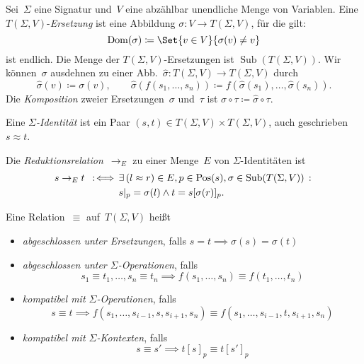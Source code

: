 \documentclass{cheat-sheet}
\DeclareMathOperator{\Pos}{Pos} %
\DeclareMathOperator{\Dom}{Dom} %
\DeclareMathOperator{\Subst}{Sub} %
\newcommand{\ident}{\approx} %
\begin{document}
\begin{defn}
  Sei~$\Sigma$ eine Signatur und~$V$ eine abzählbar unendliche Menge von Variablen.
  Eine $T(\Sigma, V)$-\emph{Ersetzung} ist eine Abbildung $\sigma : V \to T(\Sigma, V)$, für die gilt:
  \[
    \Dom(\sigma) \coloneqq \Set{v \in V}{\sigma(v) \neq v}
  \]
  ist endlich.
  Die Menge der $T(\Sigma, V)$-Ersetzungen ist $\Subst(T(\Sigma, V))$.
  Wir können~$\sigma$ ausdehnen zu einer Abb.~$\hat{\sigma} : T(\Sigma, V) \to T(\Sigma, V)$ durch
  \[
    \hat{\sigma}(v) \coloneqq \sigma(v), \qquad
    \hat{\sigma}(f(s_1, \ldots, s_n)) \coloneqq f(\hat{\sigma}(s_1), \ldots, \hat{\sigma}(s_n)).
  \]
  Die \textit{Komposition} zweier Ersetzungen~$\sigma$ und~$\tau$ ist $\sigma \circ \tau \coloneqq \hat{\sigma} \circ \tau$.
\end{defn}

\begin{defn}
  Eine \emph{$\Sigma$-Identität} ist ein Paar $(s, t) \in T(\Sigma, V) \times T(\Sigma, V)$, auch geschrieben $s \ident t$.
\end{defn}

\begin{defn}
  Die \emph{Reduktionsrelation}~$\to_E$ zu einer Menge~$E$ von $\Sigma$-Identitäten ist
  \begin{align*}
    s \to_E t \coloniff \, & \ex{(l \ident r) \in E, p \in \Pos(s), \sigma \in \Subst(T(\Sigma, V))} \\
    & s|_p = \sigma(l) \wedge t = s[\sigma(r)]_p.
  \end{align*}
\end{defn}

\begin{defn}
  Eine Relation~$\equiv$ auf~$T(\Sigma, V)$ heißt
  \begin{itemize}
    \item \emph{abgeschlossen unter Ersetzungen}, falls $s = t \implies \sigma(s) = \sigma(t)$
    \item \emph{abgeschlossen unter $\Sigma$-Operationen}, falls
    \[
      s_1 \equiv t_1, \ldots, s_n \equiv t_n \implies f(s_1, \ldots, s_n) \equiv f(t_1, \ldots, t_n)
    \]
    \item \emph{kompatibel mit $\Sigma$-Operationen}, falls
    \[
      s \equiv t \implies f(s_1, \ldots, s_{i-1}, s, s_{i+1}, s_n) \equiv f(s_1, \ldots, s_{i-1}, t, s_{i+1}, s_n)
    \]
    \item \emph{kompatibel mit $\Sigma$-Kontexten}, falls
    \[
      s \equiv s' \implies t[s]_p \equiv t[s']_p
    \]
  \end{itemize}
\end{defn}
\end{document}
